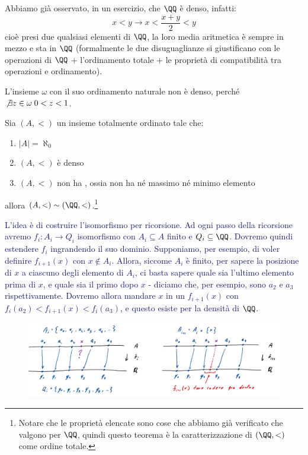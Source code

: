 \begin{example}
	Abbiamo già osservato, in un esercizio, che $\QQ$ è denso, infatti:
	\[ x < y \rightarrow x < \frac{x+y}{2} < y
		\]
	cioè presi due qualsiasi elementi di $\QQ$, la loro media aritmetica è sempre in mezzo e sta in $\QQ$ (formalmente le due disuguaglianze si giustificano con le operazioni di $\QQ$ + l'ordinamento totale + le proprietà 
	di compatibilità tra operazioni e ordinamento).
\end{example}

\begin{notexample}
	L'insieme $\omega$ con il suo ordinamento naturale non è denso, perché $\not\exists z \in \omega \; 0 < z < 1$.
\end{notexample}

\begin{theorem}
	\label{isoCantor}
	Sia $(A,<)$ un insieme totalmente ordinato tale che:
	\begin{enumerate}[1.]
		\item $|A| = \aleph_0$
		\item $(A,<)$ è denso
		\item $(A,<)$ non ha , ossia non ha né massimo né minimo elemento
	\end{enumerate}
	allora $(A,<)\sim(\QQ,<)$.\footnote{Notare che le proprietà elencate sono cose che abbiamo già verificato che valgono per $\QQ$, quindi questo teorema è la caratterizzazione di $(\QQ,<)$ come ordine totale.}
\end{theorem}

\textcolor{MidnightBlue}{L'idea è di costruire l'isomorfismo per ricorsione. Ad ogni passo della ricorsione avremo $f_i : A_i \rightarrow Q_i$ isomorfismo con $A_i \subseteq A$ finito 
e $Q_i \subseteq \QQ$. Dovremo quindi estendere $f_i$ ingrandendo il suo dominio.
Supponiamo, per esempio, di voler definire $f_{i+1}(x)$ con $x \not \in A_i$. Allora, siccome $A_i$ è finito, per sapere la posizione di $x$ a ciascuno degli elemento di $A_i$, ci basta sapere quale sia l'ultimo elemento prima di $x$,
e quale sia il primo dopo $x$ - diciamo che, per esempio, sono $a_2$  e $a_3$ rispettivamente. Dovremo allora mandare $x$ in un $f_{i+1}(x)$ con $f_i(a_2) < f_{i+1}(x) < f_i(a_3)$, e questo esiste per la densità di $\QQ$.}

\begin{figure}[H]
	\centering
	\includegraphics[width = 12cm]{immagini/IsoCantor.png}
\end{figure}

